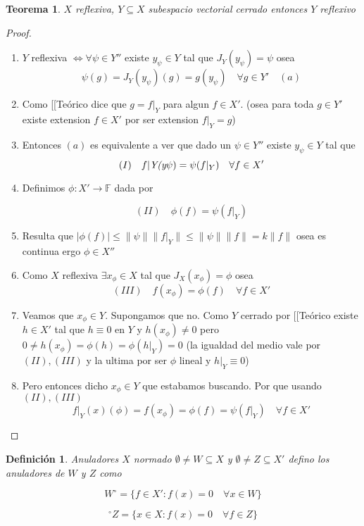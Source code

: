 \documentclass[10pt]{extarticle}
\theoremstyle{break}
\newtheorem{theorem}{Teorema}[section]
\newtheorem{definition}{Definición}[section]
\theoremstyle{definition}
\begin{document}
\begin{theorem}\label{12.4}
$X$ reflexiva, $Y\subseteq X$ subespacio vectorial cerrado entonces $Y$ reflexivo
\end{theorem}
\begin{proof}
	\begin{enumerate}
		\item $Y$ reflexiva $\iff \forall \psi\in Y''$ existe $y_{\psi}\in Y$ tal que $J_{Y}(y_{\psi})=\psi$ osea
			$$\psi(g)=J_{Y}(y_{\psi})(g)= g(y_{\psi})\quad\forall g\in Y' \quad (a)$$

		\item Como [[Teórico dice que $g=f|_{Y}$ para algun $f\in X'$. (osea para toda $g\in Y'$ existe extension $f\in X'$ por ser extension $f|_{Y}=g$)
		\item Entonces $(a)$ es equivalente a ver que dado un $\psi \in Y''$ existe $y_{\psi}\in Y$ tal que
			$$(I)\quad f|\emph{{Y}(y}{\psi})=\psi(f|_{Y})\quad\forall f\in X'$$
		\item Definimos $\phi:X'\rightarrow\mathbb{F}$ dada por

	$$(II)\quad\phi (f)=\psi(f|_{Y})$$

		\item Resulta que $\lvert \phi(f) \rvert\leq \lVert \psi \rVert\lVert f|_{Y} \rVert\leq \lVert \psi \rVert\lVert f \rVert=k\lVert f \rVert$ osea es continua ergo $\phi\in X''$
		\item Como $X$ reflexiva $\exists x_{\phi}\in X$ tal que $J_{X}(x_{\phi})=\phi$ osea
	$$(III)\quad f(x_{\phi})=\phi(f)\quad\forall f\in X'$$
		\item Veamos que $x_{\phi}\in Y$. Supongamos que no. Como $Y$ cerrado por [[Teórico existe $h\in X'$ tal que $h\equiv 0$ en $Y$ y $h(x_{\phi})\neq 0$ pero $0\neq h(x_{\phi})=\phi(h)=\phi(h|_{Y})=0$ (la igualdad del medio vale por $(II),(III)$ y la ultima por ser $\phi$ lineal y $h|_{Y}\equiv 0$)
		\item Pero entonces dicho $x_{\phi}\in Y$ que estabamos buscando. Por que usando $(II),(III)$
			$$f|_{Y}(x)(\phi)=f(x_{\phi})=\phi(f)=\psi(f|_{Y})\quad\forall f\in X'$$
	\end{enumerate}
\end{proof}

\begin{definition} Anuladores
$X$ normado $\emptyset \neq W\subseteq X$ y $\emptyset\neq Z\subseteq X'$ defino los anuladores de $W$ y $Z$ como

	$$W^{\circ} =\{f\in X':f(x) =0\quad\forall x\in W \}$$

	$$^{\circ}Z= \{x \in X : f(x)=0\quad\forall f\in Z \}$$
\end{definition}
\end{document}
